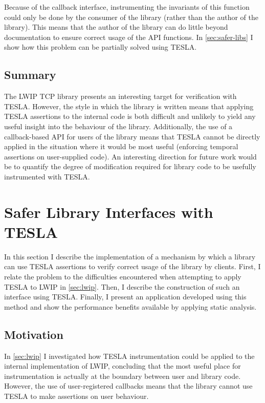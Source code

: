 Because of the callback interface, instrumenting the invariants of this
function could only be done by the consumer of the library (rather than
the author of the library). This means that the author of the library
can do little beyond documentation to ensure correct usage of the API
functions. In \autoref{sec:safer-libs} I show how this problem can be partially
solved using TESLA.

\subsection{Summary}

The LWIP TCP library presents an interesting target for verification with TESLA.
However, the style in which the library is written means that applying TESLA
assertions to the internal code is both difficult and unlikely to yield any
useful insight into the behaviour of the library. Additionally, the use of a
callback-based API for users of the library means that TESLA cannot be directly
applied in the situation where it would be most useful (enforcing temporal
assertions on user-supplied code). An interesting direction for future
work would be to quantify the degree of modification required for
library code to be usefully instrumented with TESLA.

\section{Safer Library Interfaces with TESLA} \label{sec:safer-libs}

In this section I describe the implementation of a mechanism by which a
library can use TESLA assertions to verify correct usage of the library
by clients. First, I relate the problem to the difficulties encountered
when attempting to apply TESLA to LWIP in \autoref{sec:lwip}. Then, I
describe the construction of such an interface using TESLA. Finally, I
present an application developed using this method and show the
performance benefits available by applying static analysis.

\subsection{Motivation}

In \autoref{sec:lwip} I investigated how TESLA instrumentation could be applied
to the internal implementation of LWIP, concluding that the most useful place
for instrumentation is actually at the boundary between user and library code.
However, the use of user-registered callbacks means that the library cannot use
TESLA to make assertions on user behaviour.

